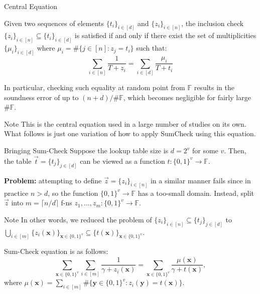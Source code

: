 \documentclass{zkdl-presentation-template}
\begin{document}
    \begin{frame}{Central Equation}
        \begin{lemma}
            Given two sequences of elements $\{t_i\}_{i \in [d]}$ and $\{z_i\}_{i \in
            [n]}$, the inclusion check $\{z_i\}_{i \in [n]} \subseteq \{t_i\}_{i \in
            [d]}$ is satisfied if and only if there exist the set of multiplicities
            $\{\mu_i\}_{i \in [d]}$ where $\mu_i = \#\{j \in [n]: z_j = t_i\}$ such that:
            \begin{equation*}
                \sum_{i \in [n]} \frac{1}{T+z_i} = \sum_{i \in [d]} \frac{\mu_i}{T+t_i}
            \end{equation*}
        \end{lemma}

        \pause In particular, checking such equality at random point from $\mathbb{F}$
        results in the soundness error of up to $(n+d)/\#\mathbb{F}$, which becomes
        negligible for fairly large $\#\mathbb{F}$.\pause

        \begin{remarkblock}{Note}
            This is the central equation used in a large number of studies on its own. What follows 
            is just one variation of how to apply SumCheck using this equation.
        \end{remarkblock}
    \end{frame}

    \begin{frame}{Bringing Sum-Check}
        Suppose the lookup table size is $d=2^v$ for some $v$. Then, the table
        $\vec{t} = \{t_j\}_{j \in [d]}$ can be viewed as a function $t:
        \{0,1\}^v \to \mathbb{F}$.\pause

        \textcolor{oc-red-8}{\textbf{Problem:}} attempting to define $\vec{z} = \{z_i\}_{i \in [n]}$
        in a similar manner fails since in practice $n>d$, so the function
        $\{0,1\}^v \to \mathbb{F}$ has a too-small domain. Instead, split $\vec{z}$ into 
        $m=\lceil n/d \rceil$ f-ns $z_1,\dots,z_m: \{0,1\}^v \to \mathbb{F}$.\pause

        \begin{remarkblock}{Note}
            In other words, we reduced the problem of $\{z_i\}_{i \in [n]}
            \subseteq \{t_j\}_{j \in [d]}$ to $\bigcup_{i \in
            [m]}\{z_i(\mathbf{x})\}_{\mathbf{x} \in \{0,1\}^v} \subseteq
            \{t(\mathbf{x})\}_{\mathbf{x} \in \{0,1\}^v}$.\pause
        \end{remarkblock}

        Sum-Check equation is as follows:
        \begin{equation*}
            \boxed{\sum_{\mathbf{x} \in \{0,1\}^v} \sum_{i \in [m]} \frac{1}{\gamma + z_i(\mathbf{x})} = \sum_{\mathbf{x} \in \{0,1\}^v} \frac{\mu(\mathbf{x})}{\gamma+t(\mathbf{x})}},
        \end{equation*}
        where $\mu(\mathbf{x}) = \sum_{i \in [m]}\#\{\mathbf{y} \in \{0,1\}^v:
        z_i(\mathbf{y})=t(\mathbf{x})\}$.
    \end{frame}
\end{document}
